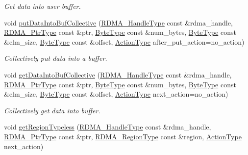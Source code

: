 \begin{DoxyCompactItemize}
\begin{DoxyCompactList}\small\item\em Get data into user buffer. \end{DoxyCompactList}\item 
void \hyperlink{structvt_1_1rdma_1_1_r_d_m_a_manager_a9f5bbbbdc2d6cca20f3bd5a259ecaf62}{put\+Data\+Into\+Buf\+Collective} (\hyperlink{namespacevt_a10442579ec4e7ebef223818e64bcf908}{R\+D\+M\+A\+\_\+\+Handle\+Type} const \&rdma\+\_\+handle, \hyperlink{namespacevt_aab05b4a584f7ee835a6d0f66915cf59b}{R\+D\+M\+A\+\_\+\+Ptr\+Type} const \&ptr, \hyperlink{namespacevt_aab8d55968084610ce3b17057981e9300}{Byte\+Type} const \&num\+\_\+bytes, \hyperlink{namespacevt_aab8d55968084610ce3b17057981e9300}{Byte\+Type} const \&elm\+\_\+size, \hyperlink{namespacevt_aab8d55968084610ce3b17057981e9300}{Byte\+Type} const \&offset, \hyperlink{namespacevt_ae0a5a7b18cc99d7b732cb4d44f46b0f3}{Action\+Type} after\+\_\+put\+\_\+action=no\+\_\+action)
\begin{DoxyCompactList}\small\item\em Collectively put data into a buffer. \end{DoxyCompactList}\item 
void \hyperlink{structvt_1_1rdma_1_1_r_d_m_a_manager_a68bf3378ec4132a81b728c180aa63686}{get\+Data\+Into\+Buf\+Collective} (\hyperlink{namespacevt_a10442579ec4e7ebef223818e64bcf908}{R\+D\+M\+A\+\_\+\+Handle\+Type} const \&rdma\+\_\+handle, \hyperlink{namespacevt_aab05b4a584f7ee835a6d0f66915cf59b}{R\+D\+M\+A\+\_\+\+Ptr\+Type} const \&ptr, \hyperlink{namespacevt_aab8d55968084610ce3b17057981e9300}{Byte\+Type} const \&num\+\_\+bytes, \hyperlink{namespacevt_aab8d55968084610ce3b17057981e9300}{Byte\+Type} const \&elm\+\_\+size, \hyperlink{namespacevt_aab8d55968084610ce3b17057981e9300}{Byte\+Type} const \&offset, \hyperlink{namespacevt_ae0a5a7b18cc99d7b732cb4d44f46b0f3}{Action\+Type} next\+\_\+action=no\+\_\+action)
\begin{DoxyCompactList}\small\item\em Collectively get data into buffer. \end{DoxyCompactList}\item 
void \hyperlink{structvt_1_1rdma_1_1_r_d_m_a_manager_a108e405a633745d46c2d68a1a0727b7c}{get\+Region\+Typeless} (\hyperlink{namespacevt_a10442579ec4e7ebef223818e64bcf908}{R\+D\+M\+A\+\_\+\+Handle\+Type} const \&rdma\+\_\+handle, \hyperlink{namespacevt_aab05b4a584f7ee835a6d0f66915cf59b}{R\+D\+M\+A\+\_\+\+Ptr\+Type} const \&ptr, \hyperlink{structvt_1_1rdma_1_1_r_d_m_a_manager_aafc574f533ebf5b34c1389ef504448bf}{R\+D\+M\+A\+\_\+\+Region\+Type} const \&region, \hyperlink{namespacevt_ae0a5a7b18cc99d7b732cb4d44f46b0f3}{Action\+Type} next\+\_\+action)

\end{DoxyCompactItemize}
